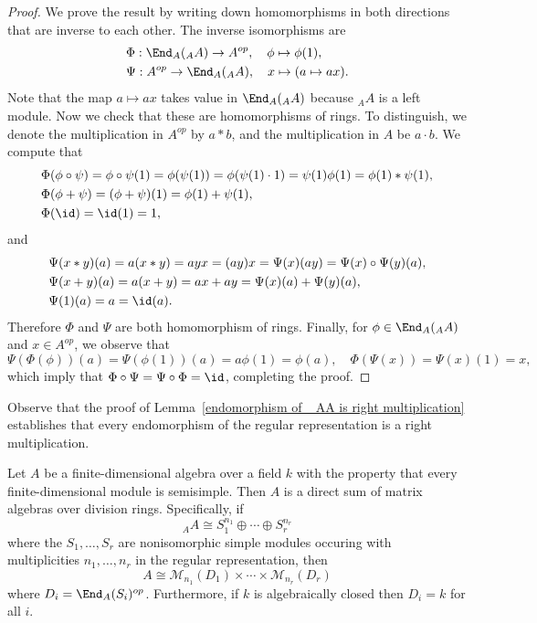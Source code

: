 \begin{proof}
We prove the result by writing down homomorphisms in both directions
that are inverse to each other. The inverse isomorphisms are
\begin{align*}
&\Phi:\End_A(_{A}A)\to A^{op},\quad \phi\mapsto\phi(1),\\
&\Psi:A^{op}\to\End_A(_{A}A),\quad x\mapsto(a\mapsto ax).
\end{align*}
Note that the map $a\mapsto ax$ takes value in $\End_{A}(_{A}A)$ because $_{A}A$ is a left module. Now we check that these are homomorphisms of rings. To distinguish, we denote the multiplication in $A^{op}$ by $a\ast b$, and the multiplication in $A$ be $a\cdot b$. We compute that
\begin{align*}
&\Phi(\phi\circ\psi)=\phi\circ\psi(1)=\phi(\psi(1))=\phi(\psi(1)\cdot 1)=\psi(1)\phi(1)=\phi(1)\ast\psi(1),\\
&\Phi(\phi+\psi)=(\phi+\psi)(1)=\phi(1)+\psi(1),\\
&\Phi(\id)=\id(1)=1,
\end{align*}
and
\begin{align*}
&\Psi(x\ast y)(a)=a(x\ast y)=ayx=(ay)x=\Psi(x)(ay)=\Psi(x)\circ\Psi(y)(a),\\
&\Psi(x+y)(a)=a(x+y)=ax+ay=\Psi(x)(a)+\Psi(y)(a),\\
&\Psi(1)(a)=a=\id(a).
\end{align*}
Therefore $\Phi$ and $\Psi$ are both homomorphism of rings. Finally, for $\phi\in\End_{A}(_{A}A)$ and $x\in A^{op}$, we observe that
\[\Psi(\Phi(\phi))(a)=\Psi(\phi(1))(a)=a\phi(1)=\phi(a),\quad \Phi(\Psi(x))=\Psi(x)(1)=x,\]
which imply that $\Phi\circ\Psi=\Psi\circ\Phi=\id$, completing the proof.
\end{proof}
\begin{remark}
Observe that the proof of Lemma~\ref{endomorphism of _AA is right multiplication} establishes that every endomorphism of the regular representation is a right multiplication.
\end{remark}
\begin{theorem}\label{Artin-Wedderburn}
Let $A$ be a finite-dimensional algebra over a field $k$ with the property that every finite-dimensional module is semisimple. Then $A$ is a direct sum of matrix algebras over division rings. Specifically, if
\[_{A}A\cong S_1^{n_1}\oplus\cdots\oplus S_r^{n_r}\]
where the $S_1,\dots,S_r$ are nonisomorphic simple modules occuring with multiplicities $n_1,\dots,n_r$ in the regular representation, then
\[A\cong\mathcal{M}_{n_1}(D_1)\times\cdots\times\mathcal{M}_{n_r}(D_r)\]
where $D_i=\End_A(S_i)^{op}$. Furthermore, if $k$ is algebraically closed then $D_i=k$ for all $i$.
\end{theorem}
